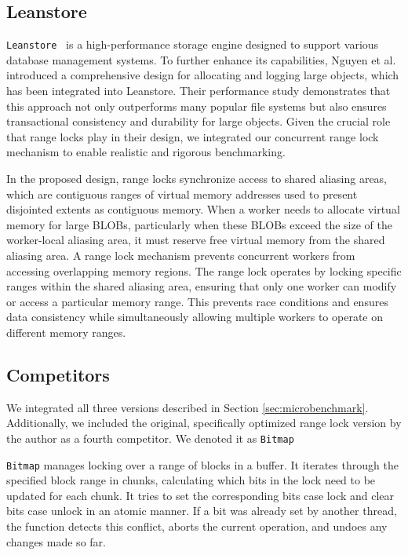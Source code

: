 \subsection{Leanstore}

\texttt{Leanstore}~\parencite{leis2018leanstore} is a high-performance storage engine designed to support various database management systems. 
To further enhance its capabilities, Nguyen et al.~\parencite{nguyen2024files} introduced a comprehensive design for allocating and logging large objects, which has been integrated into Leanstore. 
Their performance study demonstrates that this approach not only outperforms many popular file systems but also ensures transactional consistency and durability for large objects. Given the crucial role that range locks play in their design, we integrated our concurrent range lock mechanism to enable realistic and rigorous benchmarking.

In the proposed design, range locks synchronize access to shared aliasing areas, which are contiguous ranges of virtual memory addresses used to present disjointed extents as contiguous memory. 
When a worker needs to allocate virtual memory for large BLOBs, particularly when these BLOBs exceed the size of the worker-local aliasing area, it must reserve free virtual memory from the shared aliasing area. 
A range lock mechanism prevents concurrent workers from accessing overlapping memory regions. 
The range lock operates by locking specific ranges within the shared aliasing area, ensuring that only one worker can modify or access a particular memory range. 
This prevents race conditions and ensures data consistency while simultaneously allowing multiple workers to operate on different memory ranges. 

\subsection{Competitors}

We integrated all three versions described in Section \ref{sec:microbenchmark}. 
Additionally, we included the original, specifically optimized range lock version by the author as a fourth competitor. 
We denoted it as \texttt{Bitmap}

\texttt{Bitmap} manages locking over a range of blocks in a buffer. It iterates through the specified block range in chunks, calculating which bits in the lock need to be updated for each chunk. It tries to set the corresponding bits case lock and clear bits case unlock in an atomic manner. If a bit was already set by another thread, the function detects this conflict, aborts the current operation, and undoes any changes made so far. 

